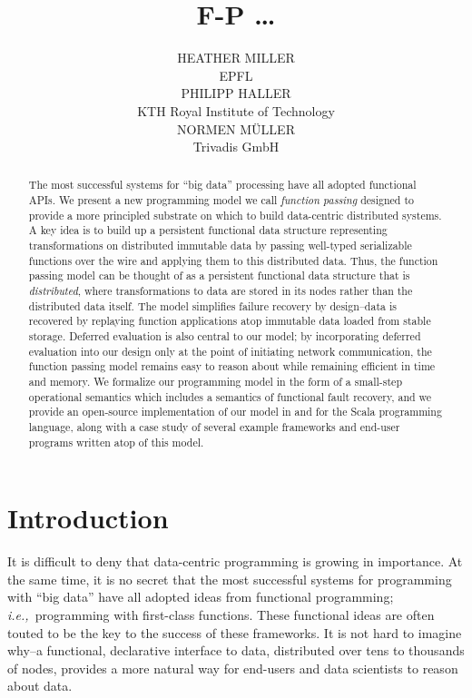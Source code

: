 \documentclass{jfp1}
\title[Journal of Functional Programming]{F-P \dots}
\author[H. Miller, P. Haller and N. M{\"u}ller]{%
  HEATHER MILLER\\ EPFL\\[1ex]%
  PHILIPP HALLER\\ KTH Royal Institute of Technology\\[1ex]%
  NORMEN M{\"U}LLER\\ Trivadis GmbH}%
\newcommand{\FP}{{\emph{function passing}}}
\newcommand{\ie}{{\em i.e.,~}}
\begin{document}
\label{firstpage}

\maketitle

\begin{abstract}
  The most successful systems for ``big data'' processing have all adopted
  functional APIs. We present a new programming model we call {\FP} designed to
  provide a more principled substrate on which to build data-centric distributed
  systems. A key idea is to build up a persistent functional data structure
  representing transformations on distributed immutable data by passing
  well-typed serializable functions over the wire and applying them to this
  distributed data. Thus, the function passing model can be thought of as a
  persistent functional data structure that is {\em distributed}, where
  transformations to data are stored in its nodes rather than the distributed
  data itself. The model simplifies failure recovery by design--data is
  recovered by replaying function applications atop immutable data loaded from
  stable storage. Deferred evaluation is also central to our model; by
  incorporating deferred evaluation into our design only at the point of
  initiating network communication, the function passing model remains easy to
  reason about while remaining efficient in time and memory. We formalize our
  programming model in the form of a small-step operational semantics which
  includes a semantics of functional fault recovery, and we provide an
  open-source implementation of our model in and for the Scala programming
  language, along with a case study of several example frameworks and end-user
  programs written atop of this model.
\end{abstract}

\tableofcontents

\section{Introduction}

It is difficult to deny that data-centric programming is growing in importance.
At the same time, it is no secret that the most successful systems for
programming with ``big data'' have all adopted ideas from functional
programming; \ie programming with first-class functions. These functional ideas
are often touted to be the key to the success of these frameworks. It is not
hard to imagine why--a functional, declarative interface to data, distributed
over tens to thousands of nodes, provides a more natural way for end-users and
data scientists to reason about data.
\end{document}
